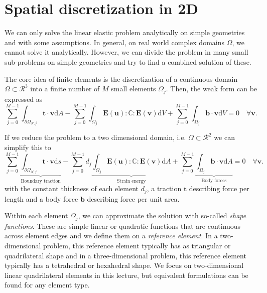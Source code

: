 \section{Spatial discretization in 2D}
We can only solve the linear elastic problem analytically on simple geometries and with some assumptions. In general, on real world complex domains $\Omega$, we cannot solve it analytically. However, we can divide the problem in many small sub-problems on simple geometries and try to find a combined solution of these.

The core idea of finite elements is the discretization of a continuous domain $\Omega \subset \mathcal{R}^3$ into a finite number of $M$ small elements $\Omega_j$. Then, the weak form can be expressed as 
\begin{equation}
    \sum_{j=0}^{M-1} \int_{\partial \Omega_{N,j}} \mathbf{t} \cdot \mathbf{v} \text{d}A
    - \sum_{j=0}^{M-1} \int_{\Omega_j} \mathbf{E}(\mathbf{u}) : \mathbb{C} :  \mathbf{E}(\mathbf{v}) \text{d}V
    + \sum_{j=0}^{M-1} \int_{\Omega_j} \mathbf{b} \cdot \mathbf{v} \text{d}V = 0 \quad \forall \mathbf{v}.
    \label{eq:discretized_weak_form_3d}
\end{equation}

If we reduce the problem to a two dimensional domain, i.e. $\Omega \subset \mathcal{R}^2$ we can simplify this to  
\begin{equation}
    \sum_{j=0}^{M-1} 
    \underbrace{\int_{\partial \Omega_{N,j}} \mathbf{t} \cdot \mathbf{v} \text{d}s}_\textrm{Boundary traction}
    - \sum_{j=0}^{M-1} d_j  
    \underbrace{\int_{\Omega_j} \mathbf{E}(\mathbf{u}) : \mathbb{C} :  \mathbf{E}(\mathbf{v}) \text{d}A}_\textrm{Strain energy}
    + \sum_{j=0}^{M-1} \underbrace{\int_{\Omega_j} \mathbf{b} \cdot \mathbf{v} \text{d}A}_\textrm{Body forces} = 0 \quad \forall \mathbf{v}.
    \label{eq:discretized_weak_form}
\end{equation}
with the constant thickness of each element $d_j$, a traction $\mathbf{t}$ describing force per length and a body force $\mathbf{b}$ describing force per unit area.

Within each element $\Omega_j$, we can approximate the solution with so-called \emph{shape functions}. These are simple linear or quadratic functions that are continuous across element edges and we define them on a \emph{reference element}. In a two-dimensional problem, this reference element typically has as triangular or quadrilateral shape and in a three-dimensional problem, this reference element typically has a tetrahedral or hexahedral shape. We focus on two-dimensional linear quadrilateral elements in this lecture, but equivalent formulations can be found for any element type. 

